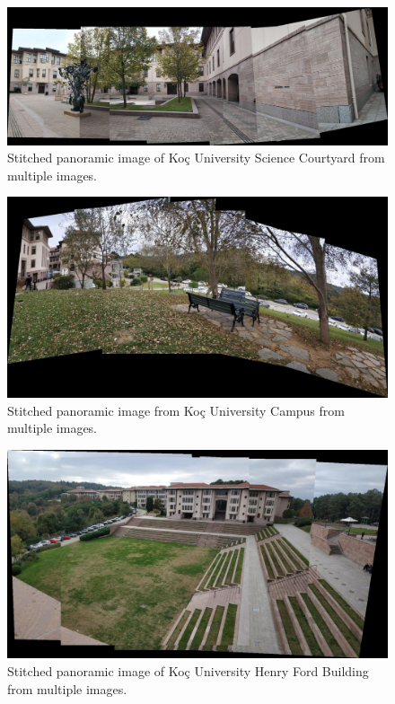 \documentclass{article}
\begin{document}
\begin{figure}[!htb]
  \centering
  \includegraphics[width=.99\textwidth]{sci_pano.jpg}
  \caption{Stitched panoramic image of Koç University Science Courtyard from multiple images.}
\end{figure}%

\newpage

\begin{figure}[!htb]
  \centering
  \includegraphics[width=.99\textwidth]{chair_pano.jpg}
  \caption{Stitched panoramic image from Koç University Campus from multiple images.}
\end{figure}%
\begin{figure}[!htb]
  \centering
  \includegraphics[width=.99\textwidth]{hf_pano.jpg}
  \caption{Stitched panoramic image of Koç University Henry Ford Building from multiple images.}
\end{figure}%
\end{document}
